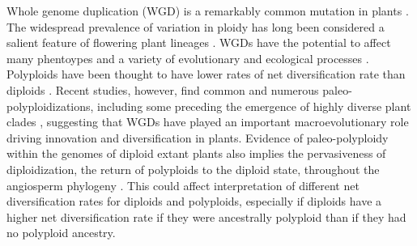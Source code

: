 Whole genome duplication (WGD) is a remarkably common mutation in plants \citep{husband_2013, zenilferguson_2017}.
The widespread prevalence of variation in ploidy has long been considered a salient feature of flowering plant lineages \citep{stebbins1938}. 
WGDs have the potential to affect many phentoypes and a variety of evolutionary \citep{ramsey_2002} and ecological processes \citep{sessa_2019}.
Polyploids have been thought to have lower rates of net diversification rate than diploids \citep{mayrose_2011, mayrose_2015}. 
Recent studies, however, find common and numerous paleo-polyploidizations, including some preceding the emergence of highly diverse plant clades \citep{soltis_2014, landis_2018}, suggesting that WGDs have played an important macroevolutionary role driving innovation and diversification in plants.
Evidence of paleo-polyploidy within the genomes of diploid extant plants also implies the pervasiveness of diploidization, the return of polyploids to the diploid state, throughout the angiosperm phylogeny \citep{soltis_2015, dodsworth_2015}.
This could affect interpretation of different net diversification rates for diploids and polyploids, especially if diploids have a higher net diversification rate if they were ancestrally polyploid than if they had no polyploid ancestry.

